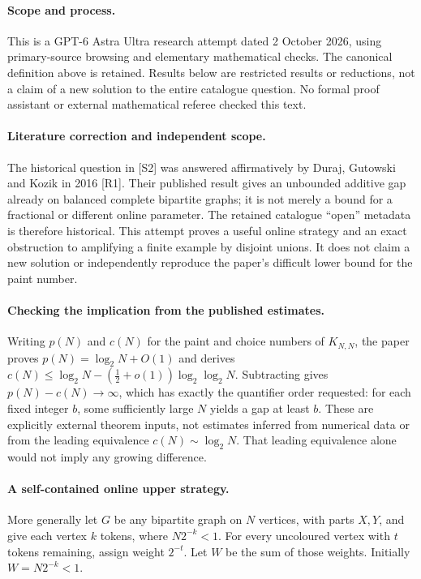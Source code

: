 \documentclass[11pt,a4paper]{article}
\begin{document}
\paragraph{Scope and process.}
This is a GPT-6 Astra Ultra research attempt dated 2 October 2026, using
primary-source browsing and elementary mathematical checks. The canonical
definition above is retained. Results below are restricted results or
reductions, not a claim of a new solution to the entire catalogue question.
No formal proof assistant or external mathematical referee checked this text.


\paragraph{Literature correction and independent scope.}
The historical question in [S2] was answered affirmatively by Duraj,
Gutowski and Kozik in 2016 [R1]. Their published result gives an
unbounded additive gap already on balanced complete bipartite graphs;
it is not merely a bound for a fractional or different online parameter.
The retained catalogue ``open'' metadata is therefore historical.
This attempt proves a useful online strategy and an exact obstruction
to amplifying a finite example by disjoint unions. It does not claim
a new solution or independently reproduce the paper's difficult lower
bound for the paint number.

\paragraph{Checking the implication from the published estimates.}
Writing $p(N)$ and $c(N)$ for the paint and choice numbers of
$K_{N,N}$, the paper proves $p(N)=\log_2N+O(1)$ and derives
$c(N)\le\log_2N-(\tfrac12+o(1))\log_2\log_2N$.
Subtracting gives $p(N)-c(N)\to\infty$, which has exactly the
quantifier order requested: for each fixed integer $b$, some sufficiently
large $N$ yields a gap at least $b$. These are explicitly external
theorem inputs, not estimates inferred from numerical data or from the
leading equivalence $c(N)\sim\log_2N$. That leading equivalence alone
would not imply any growing difference.

\paragraph{A self-contained online upper strategy.}
More generally let $G$ be any bipartite graph on $N$ vertices, with
parts $X,Y$, and give each vertex $k$ tokens, where $N2^{-k}<1$.
For every uncoloured vertex with $t$ tokens remaining, assign weight
$2^{-t}$. Let $W$ be the sum of those weights. Initially
$W=N2^{-k}<1$.
\end{document}
